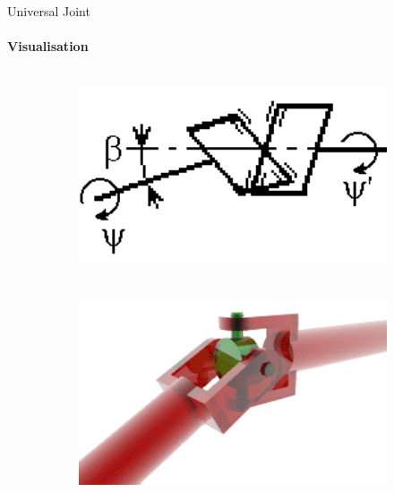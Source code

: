 \documentclass[aspectratio=169]{beamer}
\begin{document}
\begin{frame}[t]{Universal Joint}
    \framesubtitle{Visualisation}
    \vspace{-0.5cm}
    \begin{figure}[H]
        \begin{subfigure}{0.49\textwidth}
            \centering\includegraphics[height=6cm,width=1\textwidth,keepaspectratio]{universal_kinematics.png}
        \end{subfigure}
        \begin{subfigure}{0.49\textwidth}
            \href{https://en.wikipedia.org/wiki/Universal_joint\#/media/File:Universal_joint.gif}{
                \centering\includegraphics[height=6cm,width=1\textwidth,keepaspectratio]{cardan_video_preview.png}}
        \end{subfigure}
    \end{figure}
\end{frame}
\end{document}
